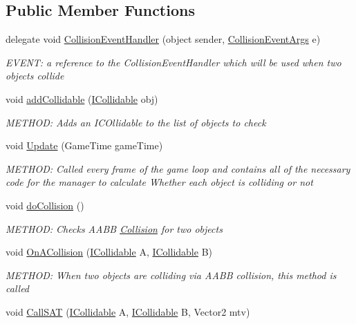 \subsection*{Public Member Functions}
\begin{DoxyCompactItemize}
\item 
delegate void \hyperlink{a00502_a7a0a94d84fd7588d01218d607e7b1d27}{Collision\+Event\+Handler} (object sender, \hyperlink{a00350}{Collision\+Event\+Args} e)
\begin{DoxyCompactList}\small\item\em E\+V\+E\+NT\+: a reference to the Collision\+Event\+Handler which will be used when two objects collide \end{DoxyCompactList}\item 
void \hyperlink{a00502_ae4daf9d957c8b30e779a7ed89237b370}{add\+Collidable} (\hyperlink{a00426}{I\+Collidable} obj)
\begin{DoxyCompactList}\small\item\em M\+E\+T\+H\+OD\+: Adds an I\+C\+Ollidable to the list of objects to check \end{DoxyCompactList}\item 
void \hyperlink{a00502_ac032340610657f865bdd3b7a82e316c3}{Update} (Game\+Time game\+Time)
\begin{DoxyCompactList}\small\item\em M\+E\+T\+H\+OD\+: Called every frame of the game loop and contains all of the necessary code for the manager to calculate Whether each object is colliding or not \end{DoxyCompactList}\item 
void \hyperlink{a00502_a6785a08302cfe7d6fb08a7042691a3a8}{do\+Collision} ()
\begin{DoxyCompactList}\small\item\em M\+E\+T\+H\+OD\+: Checks A\+A\+BB \hyperlink{a00268}{Collision} for two objects \end{DoxyCompactList}\item 
void \hyperlink{a00502_a31a209d98a58cac4f6abd47711bf545c}{On\+A\+Collision} (\hyperlink{a00426}{I\+Collidable} A, \hyperlink{a00426}{I\+Collidable} B)
\begin{DoxyCompactList}\small\item\em M\+E\+T\+H\+OD\+: When two objects are colliding via A\+A\+BB collision, this method is called \end{DoxyCompactList}\item 
void \hyperlink{a00502_a272b97e8ab5caf3dcceb455849deb6ed}{Call\+S\+AT} (\hyperlink{a00426}{I\+Collidable} A, \hyperlink{a00426}{I\+Collidable} B, Vector2 mtv)

\end{DoxyCompactItemize}
